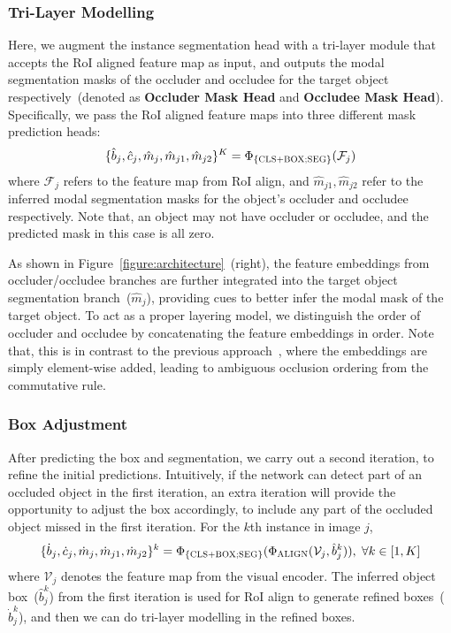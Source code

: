\documentclass{bmvc2k}
\begin{document}
\vspace{-0.2cm}
\subsubsection{Tri-Layer Modelling}
\vspace{-0.1cm}
\label{sec:trilayer_modeling}

Here, we augment the instance segmentation head with a tri-layer module that accepts the RoI aligned feature map as input, 
and outputs the modal segmentation masks of the occluder and occludee for the target object respectively~(denoted as \textbf{Occluder Mask Head} and \textbf{Occludee Mask Head}). 
Specifically, we pass the RoI aligned feature maps into three different mask prediction heads: 
\begin{align}
    \{\hat{b}_j, \hat{c}_j, \hat{m}_j, \hat{m}_{j1}, \hat{m}_{j2}\}^K = \Phi_{\{\textsc{CLS+BOX;SEG}\}}(\mathcal{F}_j)
\end{align}
where $\mathcal{F}_j$ refers to the feature map from RoI align, and
$\hat{m}_{j1}, \hat{m}_{j2}$ refer to the inferred modal segmentation masks for the object's occluder and occludee respectively. 
Note that, an object may not have occluder or occludee, and the predicted mask in this case is all zero.

As shown in Figure~\ref{figure:architecture}~(right), 
the feature embeddings from occluder/occludee branches are further integrated into the target object segmentation branch~($\hat{m}_j$), providing cues to better infer the modal mask of the target object. 
To act as a proper layering model, we distinguish the order of occluder and occludee by concatenating the feature embeddings in order. Note that, this is in contrast to the previous approach~\cite{ke2021bcnet},
where the embeddings are simply element-wise added, 
leading to ambiguous occlusion ordering from the commutative rule.

\vspace{-0.2cm}
\subsubsection{Box Adjustment}
\label{sec:adjust_box}
\vspace{-0.1cm}

After predicting the box and segmentation, 
we carry out a second iteration, to refine the initial predictions. 
Intuitively, if the network can detect part of an occluded object in the first iteration, 
an extra iteration will provide the opportunity to adjust the box accordingly, 
to include any part of the occluded object missed in the first iteration. For the $k$th instance in image $j$,
\begin{align}
   \{\dot{b}_j, \dot{c}_j, \dot{m}_j, \dot{m}_{j1}, \dot{m}_{j2}\}^k = \Phi_{\{\textsc{CLS+BOX;SEG}\}} (\Phi_{\textsc{ALIGN}}(\mathcal{V}_j, \hat{b}_j^k)), \hspace{3pt} \forall k \in [1,K]
\end{align}
where $\mathcal{V}_j$ denotes the feature map from the visual encoder. 
The inferred object box~($\hat{b}_j^k$) from the first iteration is used for RoI align to generate refined boxes~($\dot{b}_j^k$), and then we can do tri-layer modelling in the refined boxes. 
\end{document}
